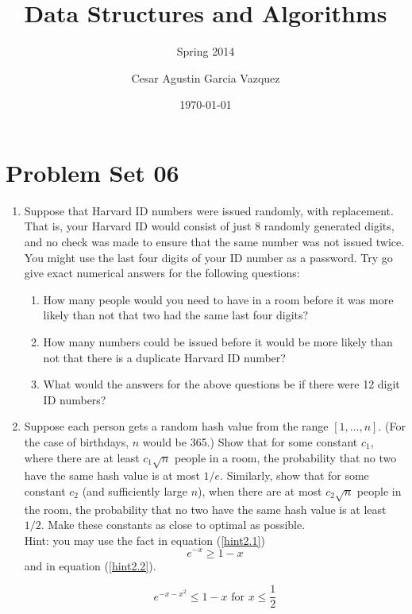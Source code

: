 \documentclass[tikz, 12pt]{scrartcl}
\title{Data Structures and Algorithms}
\subtitle{Spring 2014}
\author{Cesar Agustin Garcia Vazquez}
\date{\today}                                           %
\begin{document}
\maketitle
\section{Problem Set 06}

\begin{enumerate}
	\item Suppose that Harvard ID numbers were issued randomly, with replacement. That is, your Harvard ID would consist of just 8 randomly generated digits, and no check was made to ensure that the same number was not issued twice. You might use the last four digits of your ID number as a password. Try go give exact numerical answers for the following questions:
	\begin{enumerate}
		\item How many people would you need to have in a room before it was more likely than not that two had the same last four digits? 
		\item How many numbers could be issued before it would be more likely than not that there is a duplicate Harvard ID number?
		\item  What would the answers for the above questions be if there were 12 digit ID numbers?
	\end{enumerate}
	
	\item Suppose each person gets a random hash value from the range $[1, \ldots, n]$. (For the case of birthdays, $n$ would be 365.) Show that for some constant $c_1$, where there are at least $c_1 \sqrt{n}$ people in a room, the probability that no two have the same hash value is at most $1/e$. Similarly, show that for some constant $c_2$ (and sufficiently large $n$), when there are at most $c_2 \sqrt{n}$ people in the room, the probability that no two have the same hash value is at least $1/2$. Make these constants as close to optimal as possible.\\
	Hint: you may use the fact in equation (\ref{hint2.1})
	\begin{equation}\label{hint2.1}
		e^{-x} \geq 1 - x
	\end{equation}
	and in equation (\ref{hint2.2}).
	
	\begin{equation}\label{hint2.2}
	e^{-x - x^2} \leq 1 - x \mbox{ for } x \leq \frac{1}{2}
	\end{equation}
	

\end{enumerate}
\end{document}
